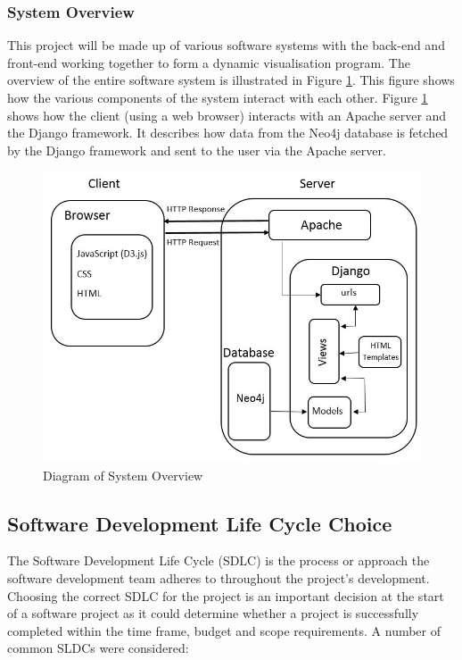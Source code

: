 \documentclass[12pt,onecolumn]{article}
\begin{document}
	\subsubsection{System Overview}
	This project will be made up of various software systems with the back-end and front-end working together to form a dynamic visualisation program. The overview of the entire software system is illustrated in Figure \ref{system}. This figure shows how the various components of the system interact with each other. Figure \ref{system} shows how the client (using a web browser) interacts with an Apache server and the Django framework. It describes how data from the Neo4j database is fetched by the Django framework and sent to the user via the Apache server.
	
	\begin{figure}[h]
		\centering
		\includegraphics[width=\textwidth]{system}
		\caption{Diagram of System Overview}
		\label{system}
	\end{figure}
	
	\subsection{Software Development Life Cycle Choice}
	The Software Development Life Cycle (SDLC) is the process or approach the software development team adheres to throughout the project's development. Choosing the correct SDLC for the project is an important decision at the start of a software project as it could determine whether a project is successfully completed within the time frame, budget and scope requirements. A number of common SLDCs were considered:
	
\end{document}
